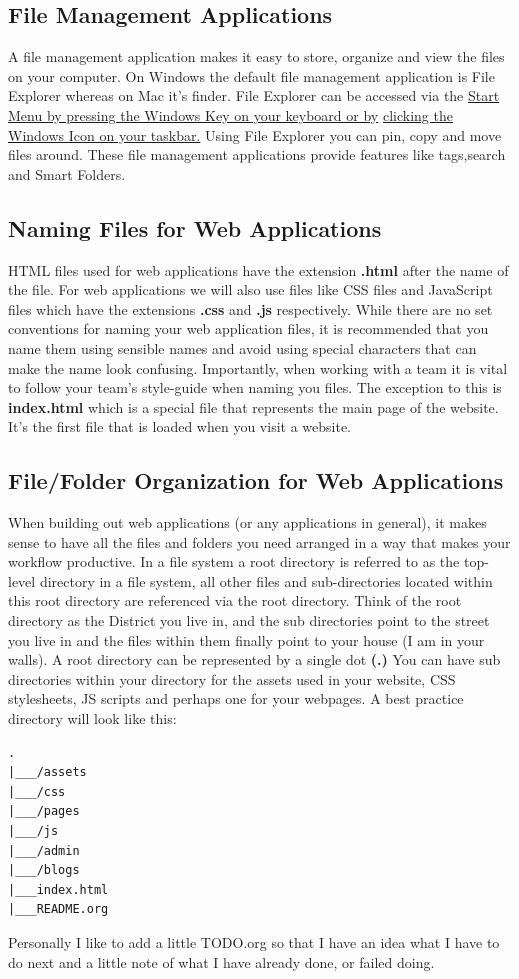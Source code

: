 \documentclass[11pt]{article}
\begin{document}
\subsection{File Management Applications}
\label{sec:orgd84a889}
A file management application makes it easy to store, organize and view the files on your
computer. On Windows the default file management application is File Explorer whereas on Mac it's
finder.
File Explorer can be accessed via the \uline{Start Menu by pressing the Windows Key on your keyboard or by}
\uline{clicking the Windows Icon on your taskbar.} Using File Explorer you can pin, copy and move files
around.
These file management applications provide features like tags,search and Smart Folders.
\subsection{Naming Files for Web Applications}
\label{sec:org77910b0}
HTML files used for web applications have the extension \textbf{.html} after the name of the file. For web
applications we will also use files like CSS files and JavaScript files which have the extensions
\textbf{.css} and \textbf{.js} respectively.
While there are no set conventions for naming your web application files, it is recommended that you
name them using sensible names and avoid using special characters that can make the name look
confusing. Importantly, when working with a team it is vital to follow your team's style-guide when
naming you files.
The exception to this is \textbf{index.html} which is a special file that represents the main page of the
website. It's the first file that is loaded when you visit a website.
\subsection{File/Folder Organization for Web Applications}
\label{sec:org83ff8ba}
When building out web applications (or any applications in general), it makes sense to have all the
files and folders you need arranged in a way that makes your workflow productive.
In a file system a root directory is referred to as the top-level directory in a file system, all
other files and sub-directories located within this root directory are referenced via the root
directory.
Think of the root directory as the District you live in, and the sub directories point to the street
you live in and the files within them finally point to your house (I am in your walls).
A root directory can be represented by a single dot \textbf{(.)}
You can have sub directories within your directory for the assets used in your website, CSS
stylesheets, JS scripts and perhaps one for your webpages.
A best practice directory will look like this:
\begin{verbatim}
.
|___/assets
|___/css
|___/pages
|___/js
|___/admin
|___/blogs
|___index.html
|___README.org
\end{verbatim}
Personally I like to add a little TODO.org so that I have an idea what I have to do next and a
little note of what I have already done, or failed doing.
\end{document}
